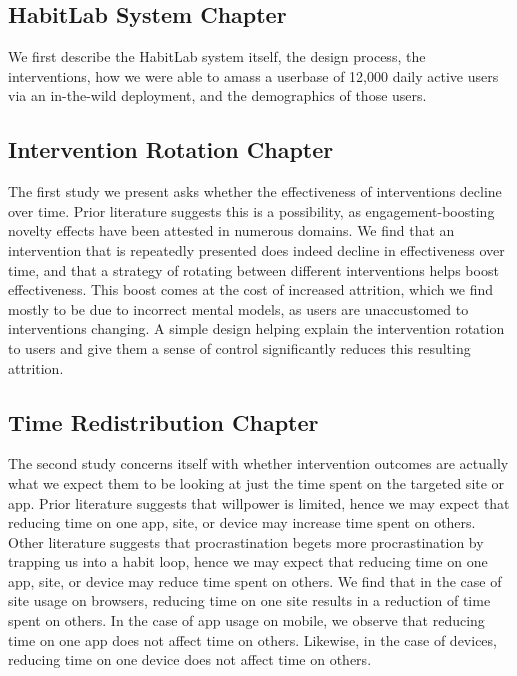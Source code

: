 
\subsection{HabitLab System Chapter}

We first describe the HabitLab system itself, the design process, the interventions, how we were able to amass a userbase of 12,000 daily active users via an in-the-wild deployment, and the demographics of those users.

\subsection{Intervention Rotation Chapter}

The first study we present asks whether the effectiveness of interventions decline over time. Prior literature suggests this is a possibility, as engagement-boosting novelty effects have been attested in numerous domains. We find that an intervention that is repeatedly presented does indeed decline in effectiveness over time, and that a strategy of rotating between different interventions helps boost effectiveness. This boost comes at the cost of increased attrition, which we find mostly to be due to incorrect mental models, as users are unaccustomed to interventions changing. A simple design helping explain the intervention rotation to users and give them a sense of control significantly reduces this resulting attrition.

\subsection{Time Redistribution Chapter}

The second study concerns itself with whether intervention outcomes are actually what we expect them to be looking at just the time spent on the targeted site or app. Prior literature suggests that willpower is limited, hence we may expect that reducing time on one app, site, or device may increase time spent on others. Other literature suggests that procrastination begets more procrastination by trapping us into a habit loop, hence we may expect that reducing time on one app, site, or device may reduce time spent on others. We find that in the case of site usage on browsers, reducing time on one site results in a reduction of time spent on others. In the case of app usage on mobile, we observe that reducing time on one app does not affect time on others. Likewise, in the case of devices, reducing time on one device does not affect time on others.

